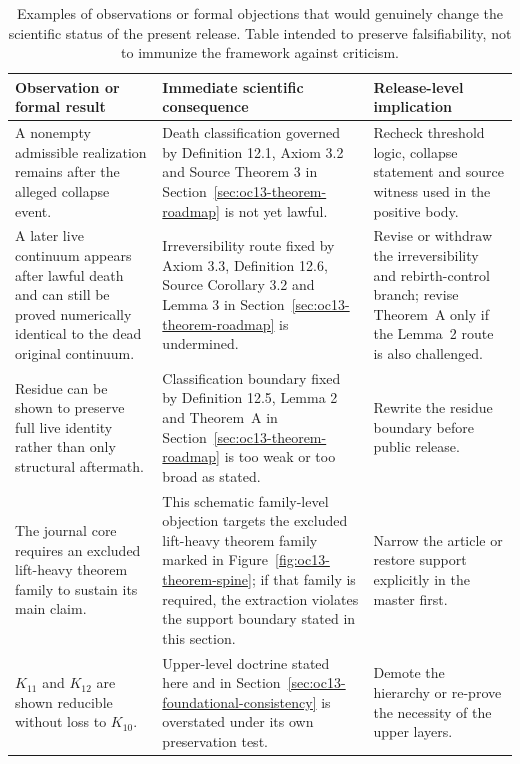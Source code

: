 \begin{table}[htbp]
\centering
\begingroup
\footnotesize
\RaggedRight
\setlength{\tabcolsep}{4pt}
\begin{tabular}{@{}L{0.27\textwidth}L{0.36\textwidth}L{0.22\textwidth}@{}}
\toprule
\textbf{Observation or formal result} & \textbf{Immediate scientific consequence} & \textbf{Release-level implication} \\
\midrule
A nonempty admissible realization remains after the alleged collapse event. & Death classification governed by Definition 12.1, Axiom 3.2 and Source Theorem 3 in Section~\ref{sec:oc13-theorem-roadmap} is not yet lawful. & Recheck threshold logic, collapse statement and source witness used in the positive body. \\
A later live continuum appears after lawful death and can still be proved numerically identical to the dead original continuum. & Irreversibility route fixed by Axiom 3.3, Definition 12.6, Source Corollary 3.2 and Lemma 3 in Section~\ref{sec:oc13-theorem-roadmap} is undermined. & Revise or withdraw the irreversibility and rebirth-control branch; revise Theorem~A only if the Lemma~2 route is also challenged. \\
Residue can be shown to preserve full live identity rather than only structural aftermath. & Classification boundary fixed by Definition 12.5, Lemma 2 and Theorem~A in Section~\ref{sec:oc13-theorem-roadmap} is too weak or too broad as stated. & Rewrite the residue boundary before public release. \\
The journal core requires an excluded lift-heavy theorem family to sustain its main claim. & This schematic family-level objection targets the excluded lift-heavy theorem family marked in Figure~\ref{fig:oc13-theorem-spine}; if that family is required, the extraction violates the support boundary stated in this section. & Narrow the article or restore support explicitly in the master first. \\
\(K_{11}\) and \(K_{12}\) are shown reducible without loss to \(K_{10}\). & Upper-level doctrine stated here and in Section~\ref{sec:oc13-foundational-consistency} is overstated under its own preservation test. & Demote the hierarchy or re-prove the necessity of the upper layers. \\
\bottomrule
\end{tabular}
\endgroup
\caption{Examples of observations or formal objections that would genuinely
change the scientific status of the present release. Table intended to
preserve falsifiability, not to immunize the framework against criticism.}
\label{tab:oc13-counterexamples}
\end{table}

